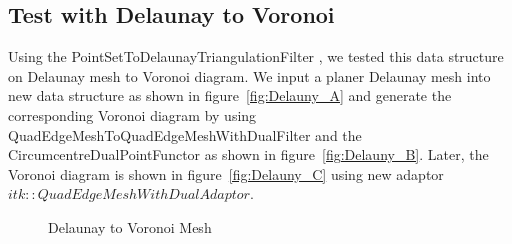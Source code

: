 \documentclass{InsightArticle}
\begin{document}
\subsection{Test with Delaunay to Voronoi}
Using the PointSetToDelaunayTriangulationFilter \cite{Rigaud2012b}, we tested this data structure on Delaunay mesh to Voronoi diagram. We input a planer Delaunay mesh into new data structure as shown in figure~\ref{fig:Delauny_A} and generate the corresponding Voronoi diagram by using QuadEdgeMeshToQuadEdgeMeshWithDualFilter and the CircumcentreDualPointFunctor as shown in figure~\ref{fig:Delauny_B}. Later, the Voronoi diagram is shown in figure~\ref{fig:Delauny_C} using new adaptor $itk::QuadEdgeMeshWithDualAdaptor$.\\
\begin{figure}[!b]
	\centering
	\caption{Delaunay to Voronoi Mesh}
\label{fig:delaunayToVoronoiMesh}
\end{figure}
\end{document}
